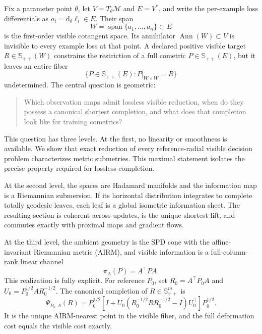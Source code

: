 \documentclass[10pt]{article}
\theoremstyle{plain}
\theoremstyle{definition}
\theoremstyle{remark}
\newcommand{\SPD}{\mathbb S_{++}}
\newcommand{\Ann}{\operatorname{Ann}}
\newcommand{\dd}{\mathrm d}
\begin{document}
Fix a parameter point \(\theta\), let \(V=T_\theta\mathcal M\) and
\(E=V^*\), and write the per-example loss differentials as
\(a_i=\dd_\theta\ell_i\in E\).  Their span
\[
  W=\operatorname{span}\{a_1,\ldots,a_n\}\subset E
\]
is the first-order visible cotangent space.  Its annihilator
\(\Ann(W)\subset V\) is invisible to every example loss at that point.  A
declared positive visible target \(R\in\SPD(W)\) constrains the restriction of
a full cometric \(P\in\SPD(E)\), but it leaves an entire fiber
\[
  \{P\in\SPD(E):P|_{W\times W}=R\}
\]
undetermined.  The central question is geometric:

\begin{quote}
Which observation maps admit lossless visible reduction, when do they possess
a canonical shortest completion, and what does that completion look like for
training cometrics?
\end{quote}

This question has three levels.  At the first, no linearity or smoothness is
available.  We show that exact reduction of every reference-radial visible
decision problem characterizes metric submetries.  This maximal statement
isolates the precise property required for lossless completion.

At the second level, the spaces are Hadamard manifolds and the information map
is a Riemannian submersion.  If its horizontal distribution integrates to
complete totally geodesic leaves, each leaf is a global isometric information
sheet.  The resulting section is coherent across updates, is the unique
shortest lift, and commutes exactly with proximal maps and gradient flows.

At the third level, the ambient geometry is the SPD cone with the
affine-invariant Riemannian metric (AIRM), and visible information is a
full-column-rank linear channel
\[
  \pi_A(P)=A^\top P A.
\]
This realization is fully explicit.  For reference \(P_0\), set
\(R_0=A^\top P_0A\) and
\(U_0=P_0^{1/2}AR_0^{-1/2}\).  The canonical completion of
\(R\in\SPD^m\) is
\begin{equation}
  \Psi_{P_0,A}(R)
  =P_0^{1/2}
  \left[I+U_0(R_0^{-1/2}RR_0^{-1/2}-I)U_0^\top\right]
  P_0^{1/2}.
  \label{eq:intro-completion}
\end{equation}
It is the unique AIRM-nearest point in the visible fiber, and the full
deformation cost equals the visible cost exactly.
\end{document}
